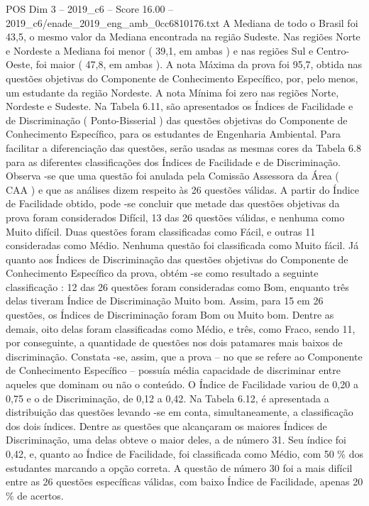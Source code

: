 \begin{textsample}{POS Dim 3 – 2019\_c6 – Score 16.00 – 2019\_c6/enade\_2019\_eng\_amb\_0cc6810176.txt}
A Mediana de todo o Brasil foi 43,5, o mesmo valor da Mediana encontrada na região Sudeste.
Nas regiões Norte e Nordeste a Mediana foi menor ( 39,1, em ambas ) e nas regiões Sul e Centro-Oeste, foi maior ( 47,8, em ambas ).
A nota Máxima da prova foi 95,7, obtida nas questões objetivas do Componente de Conhecimento Específico, por, pelo menos, um estudante da região Nordeste.
A nota Mínima foi zero nas regiões Norte, Nordeste e Sudeste.
Na Tabela 6.11, são apresentados os Índices de Facilidade e de Discriminação ( Ponto-Bisserial ) das questões objetivas do Componente de Conhecimento Específico, para os estudantes de Engenharia Ambiental.
Para facilitar a diferenciação das questões, serão usadas as mesmas cores da Tabela 6.8 para as diferentes classificações dos Índices de Facilidade e de Discriminação.
Observa -se que uma questão foi anulada pela Comissão Assessora da Área ( CAA ) e que as análises dizem respeito às 26 questões válidas.
A partir do Índice de Facilidade obtido, pode -se concluir que metade das questões objetivas da prova foram considerados Difícil, 13 das 26 questões válidas, e nenhuma como Muito difícil.
Duas questões foram classificadas como Fácil, e outras 11 consideradas como Médio.
Nenhuma questão foi classificada como Muito fácil.
Já quanto aos Índices de Discriminação das questões objetivas do Componente de Conhecimento Específico da prova, obtém -se como resultado a seguinte classificação : 12 das 26 questões foram consideradas como Bom, enquanto três delas tiveram Índice de Discriminação Muito bom.
Assim, para 15 em 26 questões, os Índices de Discriminação foram Bom ou Muito bom.
Dentre as demais, oito delas foram classificadas como Médio, e três, como Fraco, sendo 11, por conseguinte, a quantidade de questões nos dois patamares mais baixos de discriminação.
Constata -se, assim, que a prova – no que se refere ao Componente de Conhecimento Específico – possuía média capacidade de discriminar entre aqueles que dominam ou não o conteúdo.
O Índice de Facilidade variou de 0,20 a 0,75 e o de Discriminação, de 0,12 a 0,42.
Na Tabela 6.12, é apresentada a distribuição das questões levando -se em conta, simultaneamente, a classificação dos dois índices.
Dentre as questões que alcançaram os maiores Índices de Discriminação, uma delas obteve o maior deles, a de número 31.
Seu índice foi 0,42, e, quanto ao Índice de Facilidade, foi classificada como Médio, com 50 \% dos estudantes marcando a opção correta.
A questão de número 30 foi a mais difícil entre as 26 questões específicas válidas, com baixo Índice de Facilidade, apenas 20 \% de acertos.

\end{textsample}
